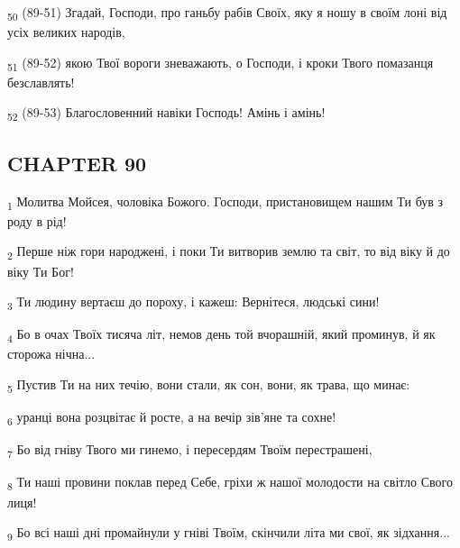 \begin{tcolorbox}
\textsubscript{50} (89-51) Згадай, Господи, про ганьбу рабів Своїх, яку я ношу в своїм лоні від усіх великих народів,
\end{tcolorbox}
\begin{tcolorbox}
\textsubscript{51} (89-52) якою Твої вороги зневажають, о Господи, і кроки Твого помазанця безславлять!
\end{tcolorbox}
\begin{tcolorbox}
\textsubscript{52} (89-53) Благословенний навіки Господь! Амінь і амінь!
\end{tcolorbox}
\subsection{CHAPTER 90}
\begin{tcolorbox}
\textsubscript{1} Молитва Мойсея, чоловіка Божого. Господи, пристановищем нашим Ти був з роду в рід!
\end{tcolorbox}
\begin{tcolorbox}
\textsubscript{2} Перше ніж гори народжені, і поки Ти витворив землю та світ, то від віку й до віку Ти Бог!
\end{tcolorbox}
\begin{tcolorbox}
\textsubscript{3} Ти людину вертаєш до пороху, і кажеш: Вернітеся, людські сини!
\end{tcolorbox}
\begin{tcolorbox}
\textsubscript{4} Бо в очах Твоїх тисяча літ, немов день той вчорашній, який проминув, й як сторожа нічна...
\end{tcolorbox}
\begin{tcolorbox}
\textsubscript{5} Пустив Ти на них течію, вони стали, як сон, вони, як трава, що минає:
\end{tcolorbox}
\begin{tcolorbox}
\textsubscript{6} уранці вона розцвітає й росте, а на вечір зів'яне та сохне!
\end{tcolorbox}
\begin{tcolorbox}
\textsubscript{7} Бо від гніву Твого ми гинемо, і пересердям Твоїм перестрашені,
\end{tcolorbox}
\begin{tcolorbox}
\textsubscript{8} Ти наші провини поклав перед Себе, гріхи ж нашої молодости на світло Свого лиця!
\end{tcolorbox}
\begin{tcolorbox}
\textsubscript{9} Бо всі наші дні промайнули у гніві Твоїм, скінчили літа ми свої, як зідхання...
\end{tcolorbox}
